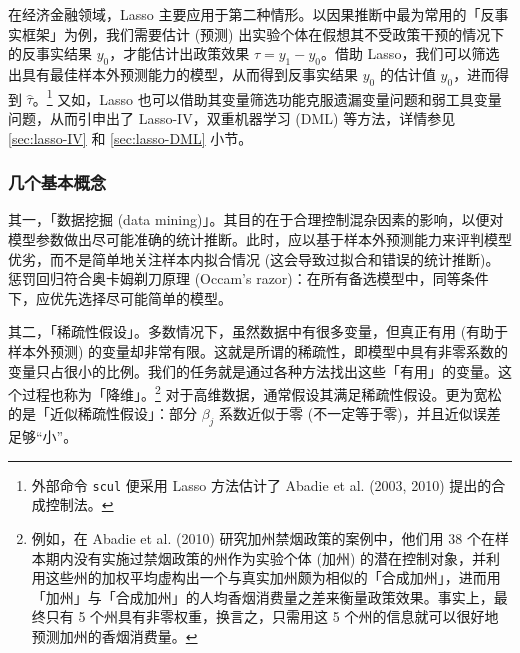 在经济金融领域，Lasso 主要应用于第二种情形。以因果推断中最为常用的「反事实框架」为例，我们需要估计 (预测) 出实验个体在假想其不受政策干预的情况下的反事实结果 $y_0$，才能估计出政策效果 $\tau = y_1 - y_0$。借助 Lasso，我们可以筛选出具有最佳样本外预测能力的模型，从而得到反事实结果 $y_0$ 的估计值 $\widehat{y}_0$，进而得到 $\widehat{\tau}$。\footnote{%
      外部命令 \texttt{scul} 便采用 Lasso 方法估计了 Abadie et al. (2003, 2010) 提出的合成控制法。}
又如，Lasso 也可以借助其变量筛选功能克服遗漏变量问题和弱工具变量问题，从而引申出了 Lasso-IV，双重机器学习 (DML) 等方法，详情参见 \ref{sec:lasso-IV} 和 \ref{sec:lasso-DML} 小节。 

\subsubsection{几个基本概念}

其一，「数据挖掘 (data mining)」。其目的在于合理控制混杂因素的影响，以便对模型参数做出尽可能准确的统计推断。此时，应以基于样本外预测能力来评判模型优劣，而不是简单地关注样本内拟合情况 (这会导致过拟合和错误的统计推断)。惩罚回归符合奥卡姆剃刀原理 (Occam's razor)：在所有备选模型中，同等条件下，应优先选择尽可能简单的模型。

其二，「稀疏性假设」。多数情况下，虽然数据中有很多变量，但真正有用 (有助于样本外预测) 的变量却非常有限。这就是所谓的稀疏性，即模型中具有非零系数的变量只占很小的比例。我们的任务就是通过各种方法找出这些「有用」的变量。这个过程也称为「降维」。\footnote{%
      例如，在 Abadie et al. (2010) 研究加州禁烟政策的案例中，他们用 38 个在样本期内没有实施过禁烟政策的州作为实验个体 (加州) 的潜在控制对象，并利用这些州的加权平均虚构出一个与真实加州颇为相似的「合成加州」，进而用「加州」与「合成加州」的人均香烟消费量之差来衡量政策效果。事实上，最终只有 5 个州具有非零权重，换言之，只需用这 5 个州的信息就可以很好地预测加州的香烟消费量。}
对于高维数据，通常假设其满足稀疏性假设。更为宽松的是「近似稀疏性假设\label{page:稀疏性假设}」：部分 $\beta_{j}$ 系数近似于零 (不一定等于零)，并且近似误差足够“小”。

